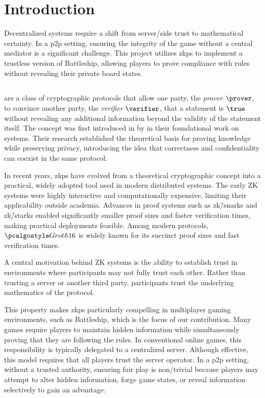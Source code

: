 \section{Introduction}
\label{sec:introduction}

Decentralized systems require a shift from server\-/side trust to mathematical certainty. In a \gls{p2p} setting, ensuring the integrity of the game without a central mediator is a significant challenge. This project utilizes \glspl{zkp} to implement a trustless version of Battleship, allowing players to prove compliance with rules without revealing their private board states.

\subsection{}

 are a class of cryptographic protocols that allow one party, the \emph{prover} $\prover$, to convince another party, the \emph{verifier} $\verifier$, that a statement is $\true$ without revealing any additional information beyond the validity of the statement itself. The concept was first introduced in \citeyear{goldwasser89} by \textcite{goldwasser89} in their foundational work on  systems. Their research established the theoretical basis for proving knowledge while preserving privacy, introducing the idea that correctness and confidentiality can coexist in the same protocol.

In recent years, \glspl{zkp} have evolved from a theoretical cryptographic concept into a practical, widely adopted tool used in modern distributed systems. The early \gls{ZK} systems were highly interactive and computationally expensive, limiting their applicability outside academia. Advances in proof systems such as \gls{zk}\=/\glspl{snark} and \gls{zk}\=/\glspl{stark} enabled significantly smaller proof sizes and faster verification times, making practical deployments feasible. Among modern protocols, $\groth$ \cite{groth16} is widely known for its succinct proof sizes and fast verification times.

A central motivation behind \gls{ZK} systems is the ability to establish trust in environments where participants may not fully trust each other. Rather than trusting a server or another third party, participants trust the underlying mathematics of the protocol.

This property makes \glspl{zkp} particularly compelling in multiplayer gaming environments, such as Battleship, which is the focus of our contribution. Many games require players to maintain hidden information while simultaneously proving that they are following the rules. In conventional online games, this responsibility is typically delegated to a centralized server. Although effective, this model requires that all players trust the server operator. In a \gls{p2p} setting, without a trusted authority, ensuring fair play is non\-/trivial because players may attempt to alter hidden information, forge game states, or reveal information selectively to gain an advantage.

